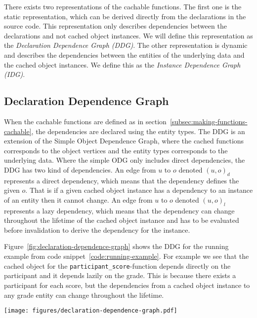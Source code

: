 There exists two representations of the cachable functions. The first one is the static representation, which can be derived directly from the declarations in the source code. This representation only describes dependencies between the declarations and not cached object instances. We will define this representation as the \emph{Declaration Dependence Graph (DDG)}. The other representation is dynamic and describes the dependencies between the entities of the underlying data and the cached object instances. We define this as the \emph{Instance Dependence Graph (IDG)}.

\subsection{Declaration Dependence Graph}
\label{subsec:declaration-dependence-graph}

When the cachable functions are defined as in section~\ref{subsec:making-functions-cachable}, the dependencies are declared using the entity types. The DDG is an extension of the Simple Object Dependence Graph, where the cached functions corresponds to the object vertices and the entity types corresponds to the underlying data. Where the simple ODG only includes direct dependencies, the DDG has two kind of dependencies. An edge from $u$ to $o$ denoted $(u, o)_d$ represents a direct dependency, which means that the dependency defines the given $o$. That is if a given cached object instance has a dependency to an instance of an entity then it cannot change. An edge from $u$ to $o$ denoted $(u, o)_l$ represents a lazy dependency, which means that the dependency can change throughout the lifetime of the cached object instance and has to be evaluated before invalidation to derive the dependency for the instance.

Figure~\ref{fig:declaration-dependence-graph} shows the DDG for the running example from code snippet~\ref{code:running-example}. For example we see that the cached object for the \verb$participant_score$-function depends directly on the participant and it depends lazily on the grade. This is because there exists a participant for each score, but the dependencies from a cached object instance to any grade entity can change throughout the lifetime.

\begin{figure*}[ht!]
  \centering
  \texttt{[image: figures/declaration-dependence-graph.pdf]}
  \caption{The Declaration Dependence Graph of the running example}
  \label{fig:declaration-dependence-graph}
\end{figure*}

